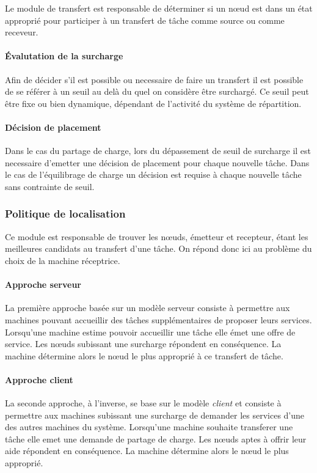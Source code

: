       Le module de transfert est responsable de déterminer si un
      n\oe{}ud est dans un état approprié pour participer à un
      transfert de tâche comme source ou comme receveur.

      \paragraph{Évalutation de la surcharge} Afin de décider s'il est
        possible ou necessaire de faire un transfert il est possible
        de se référer à un seuil au delà du quel on considère être
        surchargé. Ce seuil peut être fixe ou bien dynamique,
        dépendant de l'activité du système de répartition.

      \paragraph{Décision de placement} Dans le cas du partage de
        charge, lors du dépassement de seuil de surcharge il est
        necessaire d'emetter une décision de placement pour chaque
        nouvelle tâche.  Dans le cas de l'équilibrage de charge un
        décision est requise à chaque nouvelle tâche sans contrainte
        de seuil.

    \subsubsection{Politique de localisation}

      Ce module est responsable de trouver les n\oe{}uds, émetteur et
      recepteur, étant les meilleures candidats au transfert d'une
      tâche. On répond donc ici au problème du choix de la machine
      réceptrice.

      \paragraph{Approche serveur} La première approche basée sur
        un modèle serveur consiste à permettre aux machines pouvant
        accueillir des tâches supplémentaires de proposer leurs
        services. Lorsqu'une machine estime pouvoir accueillir une
        tâche elle émet une offre de service. Les n\oe{}uds subissant
        une surcharge répondent en conséquence. La machine détermine
        alors le n\oe{}ud le plus approprié à ce transfert de tâche.

      \paragraph{Approche client} La seconde approche, à l'inverse,
        se base sur le modèle \textit{client} et consiste à permettre
        aux machines subissant une surcharge de demander les services
        d'une des autres machines du système. Lorsqu'une machine
        souhaite transferer une tâche elle emet une demande de partage
        de charge. Les n\oe{}uds aptes à offrir leur aide répondent en
        conséquence. La machine détermine alors le n\oe{}ud le plus
        approprié.
          
